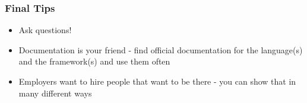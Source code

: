 \documentclass{beamer}
\begin{document}
\begin{frame}\frametitle{Final Tips}
\begin{itemize}
  \item Ask questions!
  \item Documentation is your friend - find official documentation for the
        language(s) and the framework(s) and use them often
  \item Employers want to hire people that want to be there - you can show that
        in many different ways
\end{itemize}


\end{frame}
\end{document}
